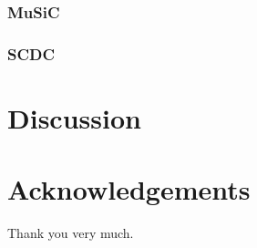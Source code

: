 \documentclass[11pt,a4paper,onecolumn,oneside]{report}
\begin{document}
            \subsubsection{MuSiC}

            \subsubsection{SCDC}
    \newpage

    \section{Discussion}
    \newpage

    
    
    \newpage

    \section*{\hfill \Large Acknowledgements \hfill}
        Thank you very much.
    \newpage

    \hbox{}
    \thispagestyle{empty}
    \clearpage
\end{document}
